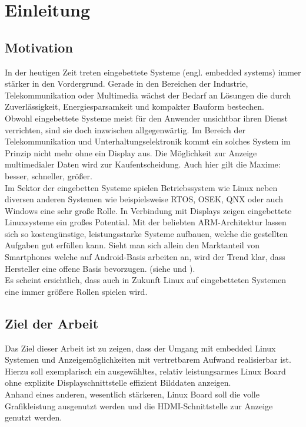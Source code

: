
\chapter{Einleitung}
\label{cha:Einleitung}

\section{Motivation}
In der heutigen Zeit treten eingebettete Systeme (engl. embedded systems) immer stärker in den Vordergrund. Gerade in den Bereichen der Industrie, Telekommunikation oder Multimedia wächst der Bedarf an Lösungen die durch Zuverlässigkeit, Energiesparsamkeit und kompakter Bauform bestechen.\\
Obwohl eingebettete Systeme meist für den Anwender unsichtbar ihren Dienst verrichten, sind sie doch inzwischen allgegenwärtig. Im Bereich der Telekommunikation und Unterhaltungselektronik kommt ein solches System im Prinzip nicht mehr ohne ein Display aus. Die Möglichkeit zur Anzeige multimedialer Daten wird zur Kaufentscheidung. Auch hier gilt die Maxime: besser, schneller, größer.\\
Im Sektor der eingebetten Systeme spielen Betriebssystem wie Linux neben diversen anderen Systemen wie beispielsweise RTOS, OSEK, QNX oder auch Windows eine sehr große Rolle. In Verbindung mit Displays zeigen eingebettete Linuxsysteme ein großes Potential. Mit der beliebten ARM-Architektur lassen sich so kostengünstige, leistungsstarke Systeme aufbauen, welche die gestellten Aufgaben gut erfüllen kann. Sieht man sich allein den Marktanteil von Smartphones welche auf Android-Basis arbeiten an, wird der Trend klar, dass Hersteller eine offene Basis bevorzugen. (siehe \cite{android2014} und \cite{Brandt2013}).\\
Es scheint ersichtlich, dass auch in Zukunft Linux auf eingebetteten Systemen eine immer größere Rollen spielen wird. 

\section{Ziel der Arbeit}
Das Ziel dieser Arbeit ist zu zeigen, dass der Umgang mit embedded Linux Systemen und Anzeigemöglichkeiten mit vertretbarem Aufwand realisierbar ist.\\
Hierzu soll exemplarisch ein ausgewähltes, relativ leistungsarmes Linux Board ohne explizite Displayschnittstelle effizient Bilddaten anzeigen.\\
Anhand eines anderen, wesentlich stärkeren, Linux Board soll die volle Grafikleistung ausgenutzt werden und die HDMI-Schnittstelle zur Anzeige genutzt werden. 

